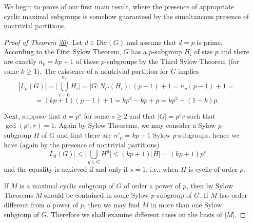 \documentclass{amsart}
\theoremstyle{definition}
\numberwithin{equation}{section}
\begin{document}
We begin to prove of our first main result, where the presence of appropriate cyclic maximal subgroups is somehow guaranteed by the simultaneous presence of nontrivial partitions. 

\begin{proof}[Proof of Theorem \ref{l0}]
Let $d\in \mathrm{Div}(G)$ and  assume that $d=p$ is prime.  According to the First Sylow Theorem, $G$ has a $p$-subgroup $H_i$ of size $p$ and  there are exactly $n_p=kp+1$ of these $p$-subgroups by the Third Sylow Theorem (for some $k \ge 1$). The existence of a nontrivial partition for $G$ implies \begin{equation} \label{npp} |L_p(G)|= \Big|\bigcup_{i=0}^{n_p}H_i \Big| = |G: N_G(H_i)| \ (p-1)+1= n_p(p-1)+1= \end{equation} 
\[=(kp+1) (p-1)+1= kp^2 - kp + p =  kp^2 +  (1-k) p .\] 



\medskip
Next, suppose that $d=p^s$ for some $s \ge 2$ and that $|G|=p^sr$ such that $\gcd(p^s,r)=1$. Again by Sylow Theorems, we may consider  a Sylow $p$-subgroup $H$ of $G$ and that there are  $n' _p=kp+1$ Sylow $p$-subgroups. 
hence we have (again by the presence of nontrivial partitions)
\begin{equation} \label{nppp}|L_d(G)| \le \Big|\bigcup_{g \in G}H^g \Big| \le (kp+1)|H|=(kp+1)p^s \end{equation} and the equality is achieved if and only if $s=1$, i.e.: when  $H$ is cyclic of order $p$. 
 


If $M$ is a maximal cyclic subgroup of $G$ of order a power of $p$, then by Sylow Theorems $M$ should be contained in some Sylow $p$-subgroup of $G$. If $M$ has order different from a power of $p$, then we may find $M$ in more than one Sylow subgroup of $G$. Therefore we shall examine different cases on the basis of  $|M|$. 



\end{proof}
\end{document}
